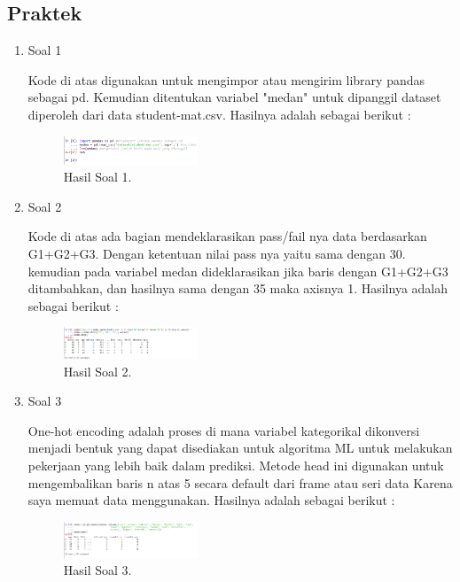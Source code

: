 \subsection{Praktek}
\begin{enumerate}
	\item Soal 1
	\hfill\break
	
	Kode di atas digunakan untuk mengimpor atau mengirim library pandas sebagai pd. Kemudian ditentukan variabel "medan" untuk dipanggil dataset diperoleh dari data student-mat.csv. Hasilnya adalah sebagai berikut :
	\begin{figure}[H]
	\centering
		\includegraphics[width=4cm]{figures/1174015/tugas2/materi/hasil1.PNG}
		\caption{Hasil Soal 1.}
	\end{figure}

	\item Soal 2
	\hfill\break
	
	Kode di atas ada bagian mendeklarasikan pass/fail nya data berdasarkan G1+G2+G3. Dengan ketentuan nilai pass nya yaitu sama dengan 30. kemudian pada variabel medan dideklarasikan jika baris dengan G1+G2+G3 ditambahkan, dan hasilnya sama dengan 35 maka axisnya 1. Hasilnya adalah sebagai berikut :
	\begin{figure}[H]
	\centering
		\includegraphics[width=4cm]{figures/1174015/tugas2/materi/hasil2.PNG}
		\caption{Hasil Soal 2.}
	\end{figure}
	
	\item Soal 3
	\hfill\break
	
	One-hot encoding adalah proses di mana variabel kategorikal dikonversi menjadi bentuk yang dapat disediakan untuk algoritma ML untuk melakukan pekerjaan yang lebih baik dalam prediksi. Metode head ini digunakan untuk mengembalikan baris n atas 5 secara default dari frame atau seri data Karena saya memuat data menggunakan. Hasilnya adalah sebagai berikut :
	\begin{figure}[H]
	\centering
		\includegraphics[width=4cm]{figures/1174015/tugas2/materi/hasil3.PNG}
		\caption{Hasil Soal 3.}
	\end{figure}


\end{enumerate}
